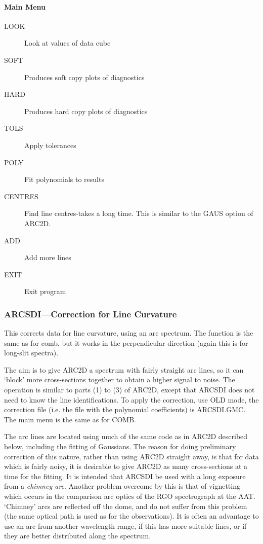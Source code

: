\documentclass[11pt,twoside]{article}
\newcommand{\xlabel}[1]{}
\begin{document}
\paragraph{Main Menu}

\begin{description}
\item[LOOK] Look at values of data cube
\item[SOFT] Produces soft copy plots of diagnostics
\item[HARD] Produces hard copy plots of diagnostics
\item[TOLS] Apply tolerances
\item[POLY] Fit polynomials to results
\item[CENTRES] Find line centres-takes a long time.
This is similar to the GAUS option of ARC2D.
\item[ADD] Add more lines
\item[EXIT] Exit program
\end{description}

\subsubsection{\xlabel{arcsdicorrection_for_line_curvature}%
ARCSDI---Correction for Line Curvature}

This corrects data for line curvature, using an arc spectrum.
The function is the same as for comb, but it works in the perpendicular
direction (again this is for long-slit spectra).

The aim is to give ARC2D a spectrum with fairly straight arc lines, so
it can `block' more cross-sections together to obtain a higher signal
to noise.
The operation is similar to parts (1) to (3) of ARC2D, except that
ARCSDI does not need to know the line identifications.
To apply the correction, use OLD mode, the correction file (i.e. the
file with the polynomial coefficients) is ARCSDI.GMC.
The main menu is the same as for COMB.

The arc lines are located using much of the same code as in ARC2D
described below, including the fitting of Gaussians. The reason for
doing preliminary correction of this nature, rather than using ARC2D
straight away, is that for data which is fairly noisy, it is desirable
to give ARC2D as many cross-sections at a time for the fitting. It is
intended that ARCSDI be used with a long exposure from a {\em chimney
arc}. Another problem overcome by this is that of vignetting which
occurs in the comparison arc optics of the RGO spectrograph at the
AAT\@. `Chimney' arcs are reflected off the dome, and do not suffer
from this problem (the same optical path is used as for the
observations). It is often an advantage to use an arc from another
wavelength range, if this has more suitable lines, or if they are
better distributed along the spectrum.
\end{document}
